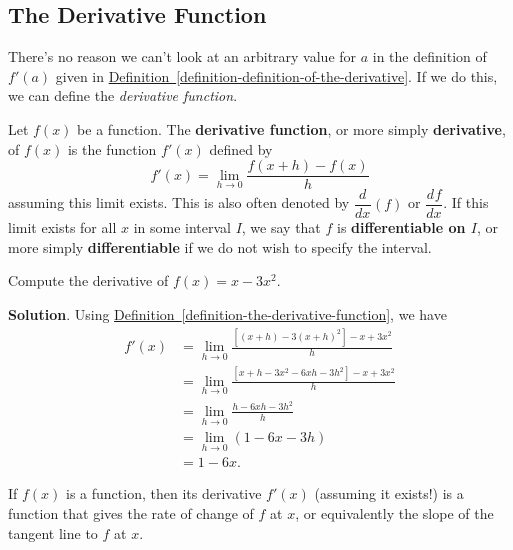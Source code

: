 \documentclass[10pt,]{book}
\newcommand{\terminology}[1]{\textbf{#1}}
\theoremstyle{ptxplainnotitle}
\theoremstyle{ptxplaintitle}
\theoremstyle{ptxplainnotitle}
\theoremstyle{ptxplaintitle}
\theoremstyle{ptxplainnotitle}
\theoremstyle{ptxplaintitle}
\theoremstyle{ptxdefinitionnotitle}
\theoremstyle{ptxdefinitiontitle}
\theoremstyle{ptxdefinitionnotitle}
\theoremstyle{ptxdefinitiontitle}
\theoremstyle{ptxdefinitionnotitle}
\theoremstyle{ptxdefinitiontitle}
\theoremstyle{ptxdefinitionnotitle}
\theoremstyle{ptxdefinitiontitle}
\theoremstyle{ptxdefinitionnotitle}
\theoremstyle{ptxdefinitiontitle}
\numberwithin{equation}{section}
\newcommand{\dv}[3][]{\dfrac{d^{#1} #2}{d #3^{#1}}}
\begin{document}
\subsection[{The Derivative Function}]{The Derivative Function}\label{subsection-the-derivative-function}
\hypertarget{p-100}{}%
There's no reason we can't look at an arbitrary value for \(a\) in the definition of \(f'(a)\) given in \hyperref[definition-definition-of-the-derivative]{Definition~\ref{definition-definition-of-the-derivative}}. If we do this, we can define the \emph{derivative function}.%
\begin{definition}\label{definition-the-derivative-function}
\hypertarget{p-101}{}%
Let \(f(x)\) be a function. The \terminology{derivative function}, or more simply \terminology{derivative}, of \(f(x)\) is the function \(f'(x)\) defined by%
\begin{equation*}
f'(x) = \lim_{h\to0}\frac{f(x+h) - f(x)}{h}
\end{equation*}
assuming this limit exists. This is also often denoted by \(\dv{}{x}(f)\) or \(\dv{f}{x}\). If this limit exists for all \(x\) in some interval \(I\), we say that \(f\) is \terminology{differentiable on \(I\)}, or more simply \terminology{differentiable} if we do not wish to specify the interval.%
\end{definition}
\begin{example}\label{example-computing-a-derivative}
\hypertarget{p-102}{}%
Compute the derivative of \(f(x) = x - 3x^{2}\).%
\par\smallskip%
\noindent\textbf{Solution}.\hypertarget{solution-22}{}\quad%
\hypertarget{p-103}{}%
Using \hyperref[definition-the-derivative-function]{Definition~\ref{definition-the-derivative-function}}, we have%
\begin{align*}
f'(x) & = \lim_{h\to0}\frac{[(x+h)-3(x+h)^{2}] - x + 3x^{2}}{h} \\
& = \lim_{h\to0}\frac{[x+h-3x^{2}-6xh-3h^{2}] - x + 3x^{2}}{h} \\
& = \lim_{h\to0}\frac{h-6xh-3h^{2}}{h} \\
& = \lim_{h\to0}(1-6x-3h) \\
& = 1-6x. 
\end{align*}
%
\end{example}
\hypertarget{p-104}{}%
If \(f(x)\) is a function, then its derivative \(f'(x)\) (assuming it exists!) is a function that gives the rate of change of \(f\) at \(x\), or equivalently the slope of the tangent line to \(f\) at \(x\).%
\end{document}
